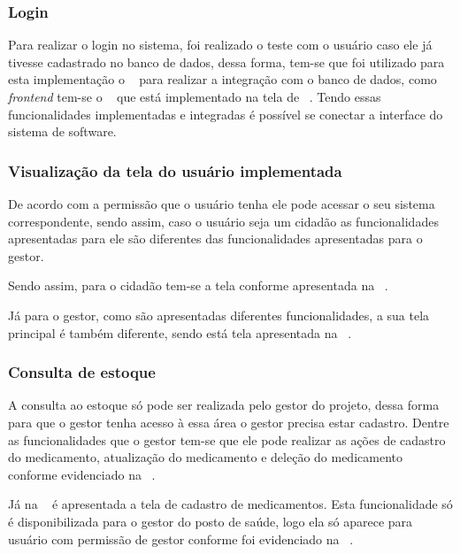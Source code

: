 \subsubsection{Login}

Para realizar o login no sistema, foi realizado o teste com o usuário caso ele já tivesse cadastrado no banco de dados, dessa forma, tem-se que foi utilizado para esta implementação o ~ para realizar a integração com o banco de dados, como \emph{frontend} tem-se o ~ que está implementado na tela de ~. Tendo essas funcionalidades implementadas e integradas é possível se conectar a interface do sistema de software.


\subsubsection{Visualização da tela do usuário implementada}

De acordo com a permissão que o usuário tenha ele pode acessar o seu sistema correspondente, sendo assim, caso o usuário seja um cidadão as funcionalidades apresentadas para ele são diferentes das funcionalidades apresentadas para o gestor.


%

Sendo assim, para o cidadão tem-se a tela conforme apresentada na ~.


%

Já para o gestor, como são apresentadas diferentes funcionalidades, a sua tela principal é também diferente, sendo está tela apresentada na ~.


\subsubsection{Consulta de estoque}

A consulta ao estoque só pode ser realizada pelo gestor do projeto, dessa forma para que o gestor tenha acesso à essa área o gestor precisa estar cadastro. Dentre as funcionalidades que o gestor  tem-se que ele pode realizar as ações de cadastro do medicamento, atualização do medicamento e deleção do medicamento conforme evidenciado na ~. 

%

%

Já na ~ é apresentada a tela de cadastro de medicamentos. Esta funcionalidade só é disponibilizada para o gestor do posto de saúde, logo ela só aparece para usuário com permissão de gestor conforme foi evidenciado na ~.
